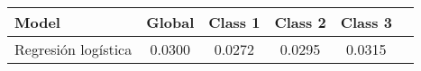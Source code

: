 \begin{tabular}{p{3cm}|c|c|c|c|c}
\toprule
               Model &  Global &  Class 1 &  Class 2 &  Class 3 \\
\midrule
 Regresión logística &  0.0300 &   0.0272 &   0.0295 &   0.0315 \\
\bottomrule
\end{tabular}
